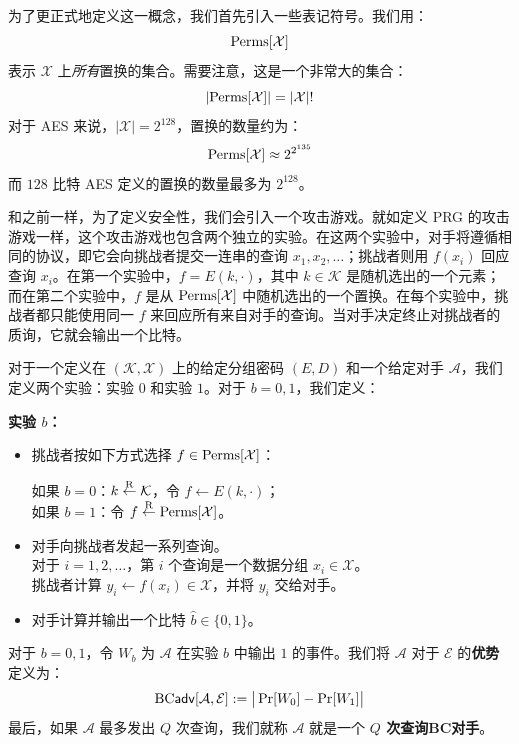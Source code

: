 为了更正式地定义这一概念，我们首先引入一些表记符号。我们用：
\[
{\rm Perms}[\mathcal{X}]
\]
表示 $\mathcal{X}$ 上\emph{所有}置换的集合。需要注意，这是一个非常大的集合：
\[
|{\rm Perms}[\mathcal{X}]|=|\mathcal{X}|!
\]
对于 AES 来说，$|\mathcal{X}|=2^{128}$，置换的数量约为：
\[
{\rm Perms}[\mathcal{X}]\approx 2^{2^{135}}
\]
而 $128$ 比特 AES 定义的置换的数量最多为 $2^{128}$。

和之前一样，为了定义安全性，我们会引入一个攻击游戏。就如定义 PRG 的攻击游戏一样，这个攻击游戏也包含两个独立的实验。在这两个实验中，对手将遵循相同的协议，即它会向挑战者提交一连串的查询 $x_1,x_2,\dots$；挑战者则用 $f(x_i)$ 回应查询 $x_i$。在第一个实验中，$f=E(k,\cdot)$，其中 $k\in\mathcal{K}$ 是随机选出的一个元素；而在第二个实验中，$f$ 是从 ${\rm Perms}[\mathcal{X}]$ 中随机选出的一个置换。在每个实验中，挑战者都只能使用同一 $f$ 来回应所有来自对手的查询。当对手决定终止对挑战者的质询，它就会输出一个比特。

\begin{game}[分组密码]\label{game:4-1}
对于一个定义在 $(\mathcal{K},\mathcal{X})$ 上的给定分组密码 $(E,D)$ 和一个给定对手 $\mathcal{A}$，我们定义两个实验：实验 $0$ 和实验 $1$。对于 $b=0,1$，我们定义：

\noindent\textbf{实验 $b$：}
\begin{itemize}
	\item 挑战者按如下方式选择 $f\in{\rm Perms}[\mathcal{X}]$：
	
	\hspace*{26pt} 如果 $b=0$：$k\overset{\rm R}\leftarrow\mathcal{K}$，令 $f\leftarrow E(k,\cdot)$；\\
	\hspace*{26pt} 如果 $b=1$：令 $f\overset{\rm R}\leftarrow{\rm Perms}[\mathcal{X}]$。
	
	\item 对手向挑战者发起一系列查询。\\
	对于 $i=1,2,\dots$，第 $i$ 个查询是一个数据分组 $x_i\in\mathcal{X}$。\\
	挑战者计算 $y_i\leftarrow f(x_i)\in\mathcal{X}$，并将 $y_i$ 交给对手。
	\item 对手计算并输出一个比特 $\hat b\in\{0,1\}$。
\end{itemize}

对于 $b=0,1$，令 $W_b$ 为 $\mathcal{A}$ 在实验 $b$ 中输出 $1$ 的事件。我们将 $\mathcal{A}$ 对于 $\mathcal{E}$ 的\textbf{优势}定义为：
\[
{\rm BC\mathsf{adv}}[\mathcal{A},\mathcal{E}]:=\big\lvert\Pr[W_0]-\Pr[W_1]\big\rvert
\]
最后，如果 $\mathcal{A}$ 最多发出 $Q$ 次查询，我们就称 $\mathcal{A}$ 就是一个 \textbf{$Q$ 次查询BC对手}。
\end{game}

